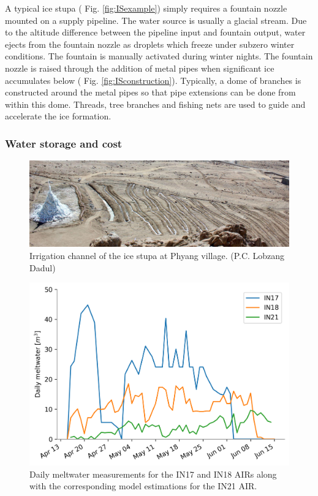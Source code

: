 A typical ice stupa ( Fig. \ref{fig:ISexample}) simply requires a fountain nozzle mounted on a supply pipeline. The
water source is usually a glacial stream. Due to the altitude difference between the pipeline input and fountain
output, water ejects from the fountain nozzle as droplets which freeze under subzero winter conditions. The
fountain is manually activated during winter nights. The fountain nozzle is raised through the addition of metal
pipes when significant ice accumulates below ( Fig. \ref{fig:ISconstruction}).  Typically, a dome of branches
is constructed around the metal pipes so that pipe extensions can be done from within this dome. Threads, tree
branches and fishing nets are used to guide and accelerate the ice formation.

\subsubsection{Water storage and cost}

\begin{figure}[htb]
\centering
\includegraphics[width=\textwidth]{figs/IS_irrigation.jpeg}

\caption{Irrigation channel of the ice stupa at Phyang village. (P.C. Lobzang Dadul) }

\label{fig:ISirrigation}
\end{figure}

\begin{figure}[htb]
\centering
\includegraphics[width=\textwidth]{figs/melt.png}

\caption{Daily meltwater measurements for the IN17 and IN18 AIRs along with the corresponding model estimations
for the IN21 AIR. }

\label{fig:ISmelt}
\end{figure}

